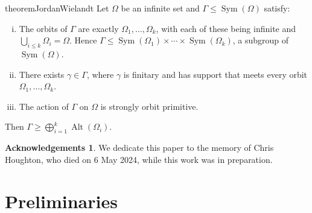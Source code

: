 \documentclass[11pt,a4paper]{amsart}
\theoremstyle{definition}
\newtheorem*{ack}{Acknowledgements}
\theoremstyle{remark}
\newcommand{\Sym}{\operatorname{Sym}}
\newcommand{\Alt}{\operatorname{Alt}}
\begin{document}
\begin{restatable*}{theorem}{JordanWielandt}\label{prodalt} Let $\Omega$ be an infinite set and $\Gamma\le\Sym(\Omega)$ satisfy:
\begin{enumerate}[(i)]
\item The orbits of $\Gamma$ are exactly $\Omega_1, \ldots, \Omega_k$, with each of these being infinite and $\bigcup_{i\le k}\Omega_i=\Omega$. Hence $\Gamma\le \Sym(\Omega_1)\times\cdots\times\Sym(\Omega_k)$, a subgroup of $\Sym(\Omega)$.
\item\label{two}  There exists $\gamma\in \Gamma$, where $\gamma$ is finitary and has support that meets every orbit $\Omega_1, \ldots, \Omega_k$.
\item\label{three} The action of $\Gamma$ on $\Omega$ is strongly orbit primitive.
\end{enumerate}
Then $\Gamma\ge \bigoplus_{i=1}^k\Alt(\Omega_i)$.
\end{restatable*}


\begin{ack}
	We dedicate this paper to the memory of Chris Houghton, who died on 6 May 2024, while this work was in preparation. 
\end{ack}

\section{Preliminaries}
\end{document}
